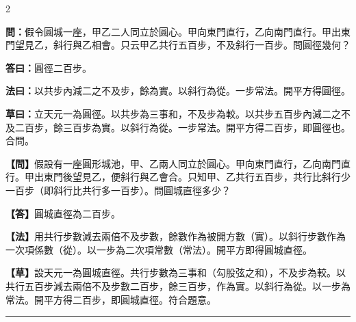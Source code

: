 \documentclass[11pt,a4paper]{article}
\newcommand{\longline}{\noindent\rule{\textwidth}{0.4pt}}
\newcommand{\wenC}[1]{\par\noindent\textbf{\textcolor{probcolor}{問：}}{#1}\par}
\newcommand{\daC}[1]{\par\noindent\textbf{\textcolor{anscolor}{答曰：}}{#1}\par}
\newcommand{\fayueC}[1]{\par\noindent\textbf{\textcolor{methodcolor}{法曰：}}{#1}\par}
\newcommand{\caoyueC}[1]{\par\noindent\textbf{草曰：}{#1}\par}
\newcommand{\wenM}[1]{\par\noindent\textbf{\textcolor{probcolor}{【問】}}{#1}\par}
\newcommand{\daM}[1]{\par\noindent\textbf{\textcolor{anscolor}{【答】}}{#1}\par}
\newcommand{\fayueM}[1]{\par\noindent\textbf{\textcolor{methodcolor}{【法】}}{#1}\par}
\newcommand{\caoyueM}[1]{\par\noindent\textbf{【草】}{#1}\par}
\begin{document}
\begin{paracol}{2}

\wenC{假令圓城一座，甲乙二人同立於圓心。甲向東門直行，乙向南門直行。甲出東門望見乙，斜行與乙相會。只云甲乙共行五百步，不及斜行一百步。問圓徑幾何？}

\daC{圓徑二百步。}

\fayueC{以共步內減二之不及步，餘為實。以斜行為從。一步常法。開平方得圓徑。}

\caoyueC{立天元一為圓徑。以共步為三事和，不及步為較。以共步五百步內減二之不及二百步，餘三百步為實。以斜行為從。一步常法。開平方得二百步，即圓徑也。合問。}

\switchcolumn

\wenM{假設有一座圓形城池，甲、乙兩人同立於圓心。甲向東門直行，乙向南門直行。甲出東門後望見乙，便斜行與乙會合。只知甲、乙共行五百步，共行比斜行少一百步（即斜行比共行多一百步）。問圓城直徑多少？}

\daM{圓城直徑為二百步。}

\fayueM{用共行步數減去兩倍不及步數，餘數作為被開方數（實）。以斜行步數作為一次項係數（從）。以一步為二次項常數（常法）。開平方即得圓城直徑。}

\caoyueM{設天元一為圓城直徑。共行步數為三事和（勾股弦之和），不及步為較。以共行五百步減去兩倍不及步數二百步，餘三百步，作為實。以斜行為從。以一步為常法。開平方得二百步，即圓城直徑。符合題意。}

\end{paracol}

\vspace{0.3cm}
\longline
\end{document}
